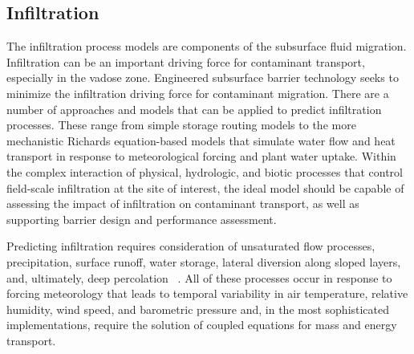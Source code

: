 %
%



\subsection{Infiltration} \label{sec:infiltration}
%

%
The infiltration process models are components of the subsurface fluid migration. 
Infiltration can be an important driving force for contaminant transport, especially in the vadose zone.  
Engineered subsurface barrier technology seeks to minimize the infiltration
driving force for contaminant migration.  
There are a number of approaches and models that can be applied to predict infiltration processes. 
These range from simple storage routing models to the more mechanistic 
Richards equation-based 
models that simulate water flow and heat transport 
in response to meteorological forcing and plant water uptake. 
Within the complex interaction of physical, hydrologic, and biotic processes 
that control field-scale infiltration at the site of interest, 
the ideal model should be capable of assessing the impact
of infiltration on contaminant transport, 
as well as supporting barrier design and performance assessment.

Predicting infiltration requires consideration of unsaturated flow processes, 
precipitation, surface runoff, water storage,  
lateral diversion along sloped layers, and, ultimately, deep percolation ~\citep{ward_1997,ward_2005}. 
All of these processes occur in response to forcing meteorology 
that leads to temporal variability in air temperature, relative humidity, wind speed, and barometric
pressure and, in the most sophisticated implementations, 
require the solution of coupled equations for mass and energy transport.

